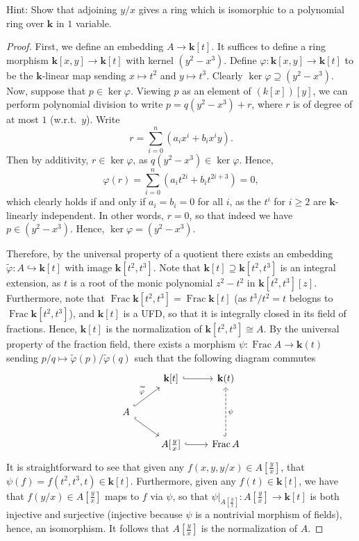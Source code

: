 \documentclass[10pt]{article}
\renewcommand{\k}{\mbf k}
\DeclareMathOperator*{\Frac}{\mathrm{Frac}}
\newcommand{\wt}{\widetilde}
\newcommand{\mbf}[1]{\mathbf{#1}}
\newcommand{\into}{\hookrightarrow}
\newcommand{\1}{\mbf 1}
\newcommand{\2}{\mbf 2}
\newcommand{\3}{\mbf 3}
\newcommand{\4}{\mbf 4}
\newcommand{\5}{\mbf 5}
\newcommand{\6}{\mbf 6}
\newcommand{\7}{\mbf 7}
\newcommand{\8}{\mbf 8}
\newcommand{\9}{\mbf 9}
\newcommand{\0}{\mbf 0}
\renewcommand{\k}{\mbf k}
\renewcommand{\(}{\left(}
\renewcommand{\)}{\right)}
\begin{document}
\begin{enumerate}[label=(\arabic*)]
    Hint: Show that adjoining $y/x$ gives a ring which is isomorphic to a polynomial ring over $\k$ in $1$ variable.
    \begin{proof}
        First, we define an embedding $A\to\k[t]$. It suffices to define a ring morphism $\k[x,y]\to\k[t]$ with kernel $(y^2-x^3)$. Define $\varphi:\k[x,y]\to\k[t]$ to be the $\k$-linear map sending $x\mapsto t^2$ and $y\mapsto t^3$. Clearly $\ker\varphi\supseteq(y^2-x^3)$. Now, suppose that $p\in\ker\varphi$. Viewing $p$ as an element of $(k[x])[y]$, we can perform polynomial division to write $p=q(y^2-x^3)+r$, where $r$ is of degree of at most $1$ (w.r.t.\ $y$). Write
        \[r=\sum_{i=0}^n(a_ix^i+b_ix^iy).\]
        Then by additivity, $r\in\ker\varphi$, as $q(y^2-x^3)\in\ker\varphi$. Hence,
        \[\varphi(r)=\sum_{i=0}^n(a_it^{2i}+b_it^{2i+3})=0,\]
        which clearly holds if and only if $a_i=b_i=0$ for all $i$, as the $t^i$ for $i\geq 2$ are $\k$-linearly independent. In other words, $r=0$, so that indeed we have $p\in(y^2-x^3)$. Hence, $\ker\varphi=(y^2-x^3)$.
 
        Therefore, by the universal property of a quotient there exists an embedding $\wt\varphi:A\into\k[t]$ with image $\k[t^2,t^3]$. Note that $\k[t]\supseteq\k[t^2,t^3]$ is an integral extension, as $t$ is a root of the monic polynomial $z^2-t^2$ in $\k[t^2,t^3][z]$. Furthermore, note that $\Frac\k[t^2,t^3]=\Frac\k[t]$ (as $t^3/t^2=t$ belogns to $\Frac\k[t^2,t^3]$), and $\k[t]$ is a UFD, so that it is integrally closed in its field of fractions. Hence, $\k[t]$ is the normalization of $\k[t^2,t^3]\cong A$. By the universal property of the fraction field, there exists a morphism $\psi:\Frac A\to\k(t)$ sending $p/q\mapsto \wt\varphi(p)/\wt\varphi(q)$ such that the following diagram commutes
        \[\begin{tikzcd}
            & {\k[t]} & {\k(t)} \\
            A \\
            & {A[\tfrac yx]} & {\Frac A}
            \arrow["\wt\varphi", hook, from=2-1, to=1-2]
            \arrow[hook, from=1-2, to=1-3]
            \arrow[hook, from=2-1, to=3-2]
            \arrow[hook, from=3-2, to=3-3]
            \arrow["\psi"', dashed, hook, from=3-3, to=1-3]
        \end{tikzcd}\]
        It is straightforward to see that given any $f(x,y,y/x)\in A[\tfrac yx]$, that $\psi(f)=f(t^2,t^3,t)\in\k[t]$. Furthermore, given any $f(t)\in\k[t]$, we have that $f(y/x)\in A[\tfrac yx]$ maps to $f$ via $\psi$, so that $\psi|_{A[\tfrac yx]}:A[\tfrac yx]\to\k[t]$ is both injective and surjective (injective because $\psi$ is a nontrivial morphism of fields), hence, an isomorphism. It follows that $A[\tfrac yx]$ is the normalization of $A$.


\end{proof}
\end{enumerate}
\end{document}
